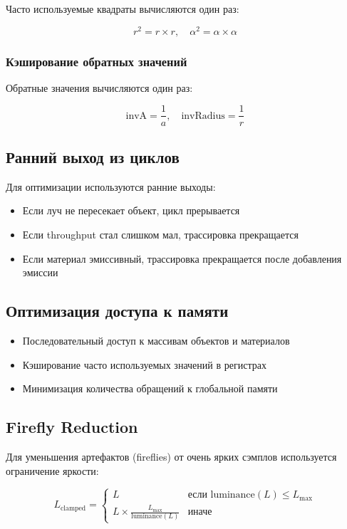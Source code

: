 \documentclass[14pt, a4paper]{extarticle}
\begin{document}
Часто используемые квадраты вычисляются один раз:

\[
r^2 = r \times r, \quad \alpha^2 = \alpha \times \alpha
\]

\subsubsection{Кэширование обратных значений}

Обратные значения вычисляются один раз:

\[
\text{invA} = \frac{1}{a}, \quad \text{invRadius} = \frac{1}{r}
\]

\subsection{Ранний выход из циклов}

Для оптимизации используются ранние выходы:

\begin{itemize}
    \item Если луч не пересекает объект, цикл прерывается
    \item Если throughput стал слишком мал, трассировка прекращается
    \item Если материал эмиссивный, трассировка прекращается после добавления эмиссии
\end{itemize}

\subsection{Оптимизация доступа к памяти}

\begin{itemize}
    \item Последовательный доступ к массивам объектов и материалов
    \item Кэширование часто используемых значений в регистрах
    \item Минимизация количества обращений к глобальной памяти
\end{itemize}

\subsection{Firefly Reduction}

Для уменьшения артефактов (fireflies) от очень ярких сэмплов используется ограничение яркости:

\[
L_{\text{clamped}} = \begin{cases}
L & \text{если } \text{luminance}(L) \leq L_{\max} \\
L \times \frac{L_{\max}}{\text{luminance}(L)} & \text{иначе}
\end{cases}
\]
\end{document}
